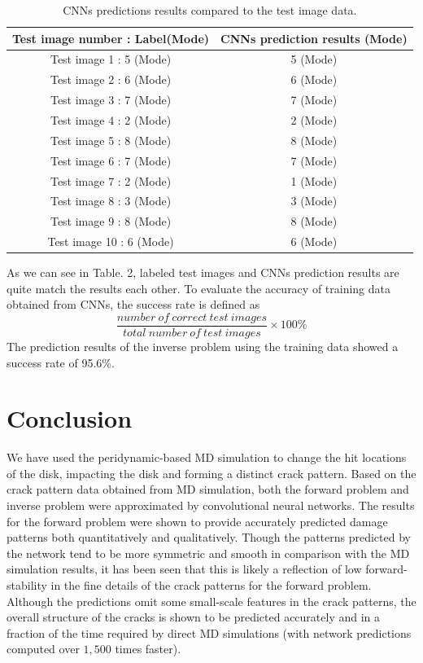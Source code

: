 \begin{table}[h!]
\centering
\caption{CNNs predictions results compared to the test image data.}
\label{tab:1}       
\begin{tabular}{c|c}
\hline
\hline
Test image number : Label(Mode) & CNNs prediction results (Mode) \\
\hline
Test image 1 : 5 (Mode) & 5 (Mode) \\
Test image 2 : 6 (Mode) & 6 (Mode) \\
Test image 3 : 7 (Mode) & 7 (Mode) \\
Test image 4 : 2 (Mode) & 2 (Mode) \\
Test image 5 : 8 (Mode) & 8 (Mode) \\
Test image 6 : 7 (Mode) & 7 (Mode) \\
Test image 7 : 2 (Mode) & 1 (Mode) \\
Test image 8 : 3 (Mode) & 3 (Mode) \\
Test image 9 : 8 (Mode) & 8 (Mode) \\
Test image 10 : 6 (Mode) & 6 (Mode) \\
\hline
\end{tabular}
\end{table}
As we can see in Table. 2, labeled test images and CNNs prediction results are quite match the results each other. To evaluate the accuracy of training data obtained from CNNs, the success rate is defined as
\begin{equation} 
\frac{number\ of\ correct\ test\ images}{total\ number\ of\ test\ images} \times 100\%
\end{equation}
The prediction results of the inverse problem using the training data showed a success rate of 95.6\%.
\section{Conclusion}
\label{sec:5}


We have used the peridynamic-based MD simulation to change the hit locations of the disk, impacting the disk and forming a distinct crack pattern. Based on the crack pattern data obtained from MD simulation, both the forward problem and inverse problem were approximated by convolutional neural networks.  The results for the forward problem were shown to provide accurately predicted damage patterns both quantitatively and qualitatively.  Though the patterns predicted by the network tend to be more symmetric and smooth in comparison with the MD simulation results, it has been seen that this is likely a reflection of low forward-stability in the fine details of the crack patterns for the forward problem.  Although the predictions omit some small-scale features in the crack patterns, the overall structure of the cracks is shown to be predicted accurately and in a fraction of the time required by direct MD simulations (with network predictions computed over $1,500$ times faster).

